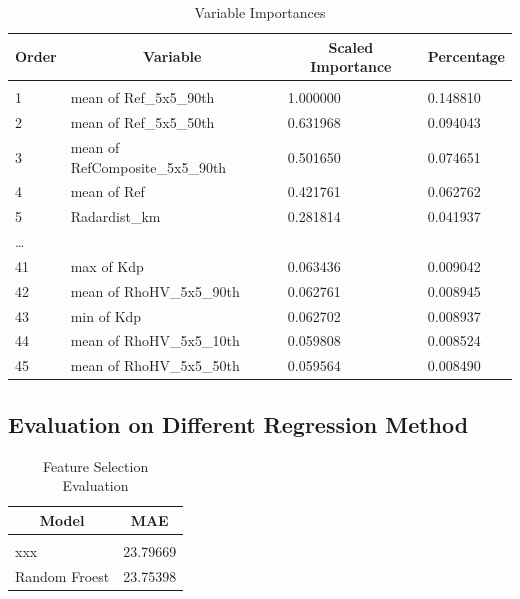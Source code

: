 \documentclass{article} %
\begin{document}
\begin{table}[h]
\caption{Variable Importances}
\label{feat-importance}
\begin{center}
\begin{tabular}{llll}
\multicolumn{1}{c}{\bf Order}  &\multicolumn{1}{c}{\bf Variable}  &\multicolumn{1}{c}{\bf Scaled Importance} &\multicolumn{1}{c}{\bf Percentage}
\\ \hline \\
1 &mean of Ref\_5x5\_90th  &1.000000   &0.148810  \\
2 &mean of Ref\_5x5\_50th  &0.631968   &0.094043  \\
3 &mean of RefComposite\_5x5\_90th  &0.501650   &0.074651  \\
4 &mean of Ref  &0.421761   &0.062762  \\
5 &Radardist\_km  &0.281814  &0.041937  \\
\ldots\\
41 &max of Kdp  &0.063436   &0.009042\\
42 &mean of RhoHV\_5x5\_90th  &0.062761  &0.008945\\
43 &min of Kdp  &0.062702   &0.008937\\
44 &mean of RhoHV\_5x5\_10th  &0.059808   &0.008524\\
45 &mean of RhoHV\_5x5\_50th  &0.059564   &0.008490\\
\end{tabular}
\end{center}
\end{table}


\subsection{Evaluation on Different Regression Method}

\begin{table}[h]
\caption{Feature Selection Evaluation}
\label{model-cmp-table}
\begin{center}
\begin{tabular}{ll}
\multicolumn{1}{c}{\bf Model}  &\multicolumn{1}{c}{\bf MAE}
\\ \hline \\
xxx             &23.79669 \\
Random Froest            &23.75398 \\
\end{tabular}
\end{center}
\end{table}
\end{document}
